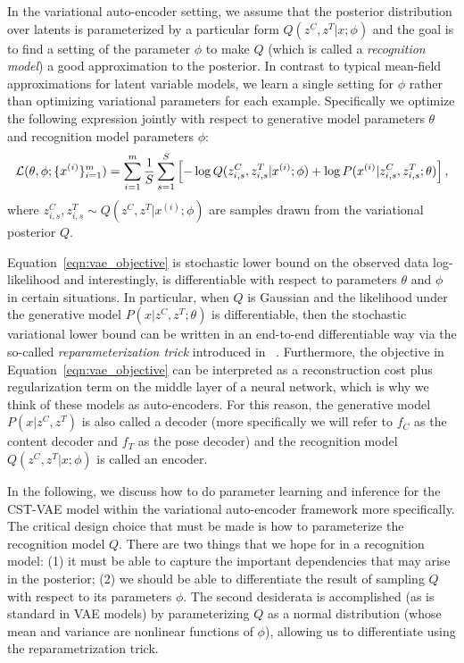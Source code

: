 In the variational auto-encoder setting, we assume that the posterior distribution over latents is parameterized by a particular form
 $Q(z^C, z^T|x;\phi)$ and the goal is to find a setting of
the parameter $\phi$ to make $Q$ (which is called a \emph{recognition model}) a good approximation to the posterior.  
In contrast to typical mean-field approximations for latent variable models,
we learn a single setting for $\phi$ rather than optimizing variational parameters for each example. 
Specifically we optimize the following expression
jointly with respect to generative model parameters $\theta$ and recognition model parameters $\phi$:
\begin{equation}\label{eqn:vae_objective}\footnotesize
\mathcal{L}(\theta, \phi; \{x^{(i)}\}_{i=1}^m)
	= \sum_{i=1}^m \frac{1}{S}\sum_{s=1}^S \left[-\log Q(z_{i,s}^C, z_{i,s}^T | x^{(i)};\phi) + \log P(x^{(i)} | z_{i,s}^C, z_{i,s}^T; \theta) \right],
\end{equation}
where $z_{i,s}^C, z_{i,s}^T \sim Q(z^C, z^T | x^{(i)};\phi) $ are samples drawn from the variational posterior $Q$.

Equation~\ref{eqn:vae_objective} is stochastic lower bound on the observed data log-likelihood and interestingly,
is differentiable with respect to parameters $\theta$ and $\phi$ in certain situations. In particular,
when $Q$ is Gaussian and the likelihood under the generative model $P(x|z^C,z^T; \theta)$ is differentiable, 
then the stochastic variational lower bound can be written in an end-to-end
differentiable way via the so-called \emph{reparameterization trick} introduced in ~\cite{Kingma2014}.
Furthermore, the objective in Equation~\ref{eqn:vae_objective} can be interpreted as a reconstruction cost plus regularization term on the middle layer
of a neural network, which is why we think of these models as auto-encoders.  
For this reason, the generative model $P(x|z^C, z^T )$ is also called a decoder (more specifically we will
refer to $f_C$ as the content decoder and $f_T$ as the pose decoder) and the recognition model $Q(z^C, z^T|x;\phi)$
is called an encoder.

In the following, we discuss how to do parameter learning and inference for the CST-VAE model
within the variational auto-encoder framework more specifically.
The critical design choice that must be made is how to parameterize  the recognition model $Q$. There are two things 
that we hope for in a recognition model: (1) it must be able to 
capture the important dependencies that may arise in the posterior; (2) we should be able to differentiate the result of
sampling $Q$ with respect to its parameters $\phi$.  The second desiderata is accomplished (as is standard in VAE models)
by parameterizing $Q$ as a normal distribution (whose mean and variance are nonlinear functions of $\phi$), allowing us to differentiate using the 
reparametrization trick.  



